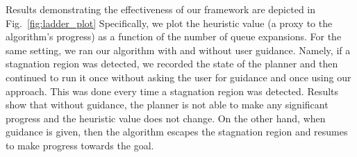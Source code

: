 \documentclass{article}
\begin{document}
Results demonstrating the effectiveness of our framework are depicted in Fig.~\ref{fig:ladder_plot}
Specifically, we plot the heuristic value (a proxy to the algorithm's progress) as a function of the number of queue expansions.
For the same setting, we ran our algorithm with and without user guidance.
Namely, if a stagnation region was detected, we recorded the state of the planner and then continued to run it once without asking the user for guidance and once using our approach. This was done every time a stagnation region was detected. 
Results show that without guidance, the planner is not able to make any significant progress and the heuristic value does not change.
On the other hand, when guidance is given, then the algorithm escapes the stagnation region and resumes to make progress towards the goal.






 
\end{document}
